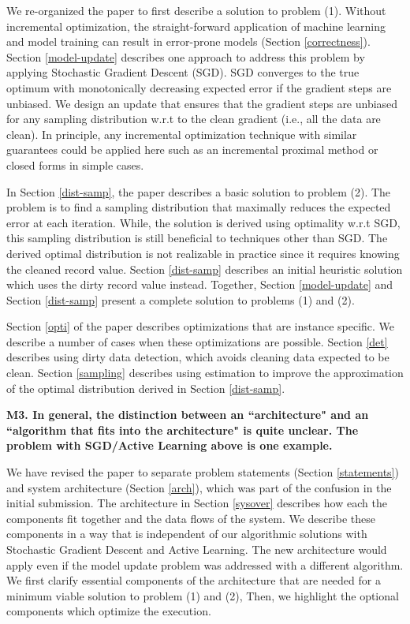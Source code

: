 We re-organized the paper to first describe a solution to problem (1).
Without incremental optimization, the straight-forward application of machine learning and model training can result in error-prone models (Section \ref{correctness}).
Section \ref{model-update} describes one approach to address this problem by applying Stochastic Gradient Descent (SGD).
SGD converges to the true optimum with monotonically decreasing expected error if the gradient steps are unbiased.
We design an update that ensures that the gradient steps are unbiased for any sampling distribution w.r.t to the clean gradient (i.e., all the data are clean).
In principle, any incremental optimization technique with similar guarantees could be applied here such as an incremental proximal method or closed forms in simple cases.

In Section \ref{dist-samp}, the paper describes a basic solution to problem (2).
The problem is to find a sampling distribution that maximally reduces the expected error
at each iteration.
While, the solution is derived using optimality w.r.t SGD, this sampling distribution is still beneficial to techniques other than SGD.
The derived optimal distribution is not realizable in practice since it requires knowing the cleaned record value.
Section \ref{dist-samp} describes an initial heuristic solution which uses the dirty record value instead.
Together, Section \ref{model-update} and Section  \ref{dist-samp} present a complete solution to problems (1) and (2).

Section \ref{opti} of the paper describes optimizations that are instance specific.
We describe a number of cases when these optimizations are possible.
Section \ref{det} describes using dirty data detection, which avoids cleaning data expected to be clean.
Section \ref{sampling} describes using estimation to improve the approximation of the optimal distribution derived in Section \ref{dist-samp}.

\vspace{0.5em}

\noindent\textbf{M3. In general, the distinction between an ``architecture" and an ``algorithm that fits into the architecture" is quite unclear. The problem with SGD/Active Learning above is one example.}

We have revised the paper to separate problem statements (Section \ref{statements}) and system architecture (Section \ref{arch}), which was part of the confusion in the initial submission.
The architecture in Section \ref{sysover} describes how each the components fit together and the data flows of the system.
We describe these components in a way that is independent of our algorithmic solutions with Stochastic Gradient Descent and Active Learning.
The new architecture would apply even if the model update problem was addressed with a different algorithm.
We first clarify essential components of the architecture that are needed for a minimum viable solution to problem (1) and (2), 
Then, we highlight the optional components which optimize the execution.

